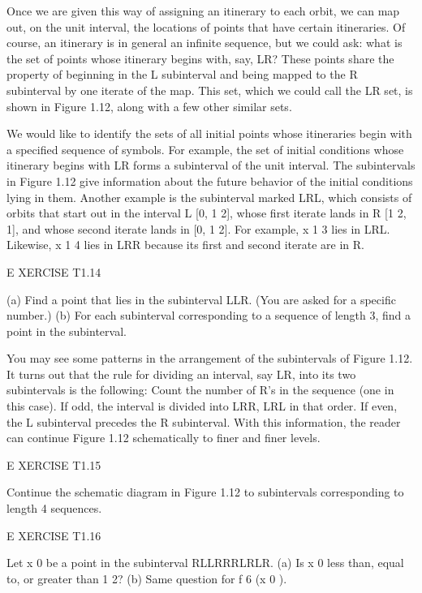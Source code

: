 \documentclass[12pt]{article}
\begin{document}
Once we are given this way of assigning an itinerary to each orbit, we can map out, on the unit interval, 
the locations of points that have certain itineraries. Of course, an itinerary is in general an infinite 
sequence, but we could ask: what is the set of points whose itinerary begins with, say, LR? These points 
share the property of beginning in the L subinterval and being mapped to the R subinterval by one iterate 
of the map. This set, which we could call the LR set, is shown in Figure 1.12, along with a few other 
similar sets.

We would like to identify the sets of all initial points whose itineraries begin with a specified sequence 
of symbols. For example, the set of initial conditions whose itinerary begins with LR forms a subinterval 
of the unit interval. The subintervals in Figure 1.12 give information about the future behavior of the 
initial conditions lying in them. Another example is the subinterval marked LRL, which consists of orbits 
that start out in the interval L  [0, 1  2], whose first iterate lands in R  [1  2, 1], and whose second 
iterate lands in [0, 1  2]. For example, x  1  3 lies in LRL. Likewise, x  1  4 lies in LRR because its 
first and second iterate are in R.

 

E XERCISE T1.14

(a) Find a point that lies in the subinterval LLR. (You are asked for a specific number.) (b) For each 
subinterval corresponding to a sequence of length 3, find a point in the subinterval.

You may see some patterns in the arrangement of the subintervals of Figure 1.12. It turns out that the rule 
for dividing an interval, say LR, into its two subintervals is the following: Count the number of R’s in 
the sequence (one in this case). If odd, the interval is divided into LRR, LRL in that order. If even, the 
L subinterval precedes the R subinterval. With this information, the reader can continue Figure 1.12 
schematically to finer and finer levels.

E XERCISE T1.15

Continue the schematic diagram in Figure 1.12 to subintervals corresponding to length 4 sequences.

 

E XERCISE T1.16

Let x 0 be a point in the subinterval RLLRRRLRLR. (a) Is x 0 less than, equal to, or greater than 1  2? (b) 
Same question for f 6 (x 0 ).
\end{document}
